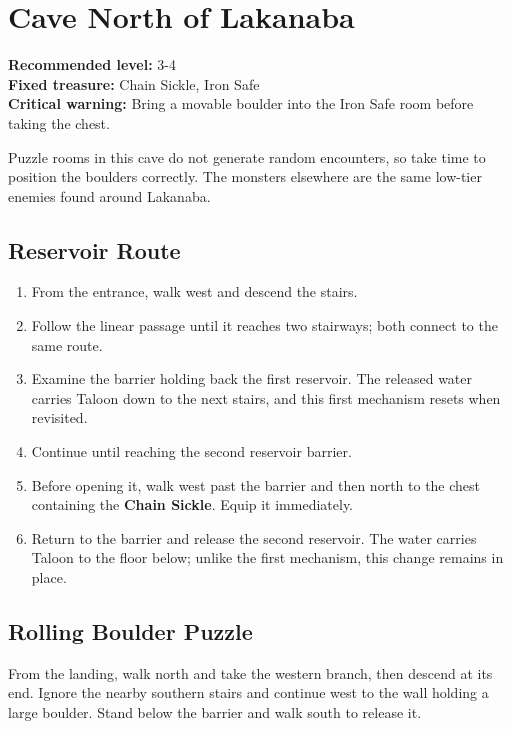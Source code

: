 \documentclass[
  american,
  10pt,
  letterpaper,
  oneside,
  open=any]{scrreprt}
\providecommand{\tightlist}{%
  \setlength{\itemsep}{0pt}\setlength{\parskip}{0pt}}
\begin{document}
\section{Cave North of Lakanaba}\label{cave-north-of-lakanaba}

\textbf{Recommended level:} 3-4\\
\textbf{Fixed treasure:} Chain Sickle, Iron Safe\\
\textbf{Critical warning:} Bring a movable boulder into the Iron Safe
room before taking the chest.

Puzzle rooms in this cave do not generate random encounters, so take
time to position the boulders correctly. The monsters elsewhere are the
same low-tier enemies found around Lakanaba.

\subsection{Reservoir Route}\label{reservoir-route}

\begin{enumerate}
\def\labelenumi{\arabic{enumi}.}
\tightlist
\item
  From the entrance, walk west and descend the stairs.
\item
  Follow the linear passage until it reaches two stairways; both connect
  to the same route.
\item
  Examine the barrier holding back the first reservoir. The released
  water carries Taloon down to the next stairs, and this first mechanism
  resets when revisited.
\item
  Continue until reaching the second reservoir barrier.
\item
  Before opening it, walk west past the barrier and then north to the
  chest containing the \textbf{Chain Sickle}. Equip it immediately.
\item
  Return to the barrier and release the second reservoir. The water
  carries Taloon to the floor below; unlike the first mechanism, this
  change remains in place.
\end{enumerate}

\subsection{Rolling Boulder Puzzle}\label{rolling-boulder-puzzle}

From the landing, walk north and take the western branch, then descend
at its end. Ignore the nearby southern stairs and continue west to the
wall holding a large boulder. Stand below the barrier and walk south to
release it.
\end{document}
